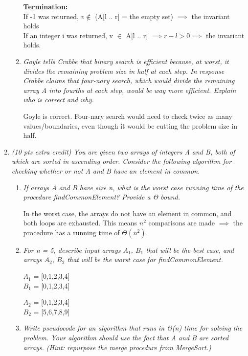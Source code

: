 \documentclass[12pt]{article}
\begin{document}
\begin{enumerate}
\begin{enumerate}
		\textbf{Termination:}\\ If -1 was returned, $v \notin$ (A[l .. r] = the empty set) $\implies$ the invariant holds \\ 
		If an integer i was returned, v $\in$ A[l .. r] $\implies r - l > 0 \implies$ the invariant holds.


		\item \textit{ Goyle tells Crabbe that binary search is efficient because, at worst, it divides the remaining problem size in half at each step. In response Crabbe claims that four-nary search, which would divide the remaining array A into fourths at each step, would be way more efficient. Explain who is correct and why.} 

		Goyle is correct. Four-nary search would need to check twice as many values/boundaries, even though it would be cutting the problem size in half. 


	\end{enumerate} 

	\newpage

	\item \textit{(10 pts extra credit) You are given two arrays of integers A and B, both of which are sorted in ascending order. Consider the following algorithm for checking whether or not A and B have an element in common.}


	\begin{enumerate}

		\item \textit{If arrays A and B have size n, what is the worst case running time of the procedure findCommonElement? Provide a Θ bound.} 

		In the worst case, the arrays do not have an element in common, and both loops are exhausted. This means $n^2$ comparisons are made $\implies$ the procedure has a running time of $\Theta(n^2)$.

		\item \textit{For n = 5, describe input arrays $A_1$, $B_1$ that will be the best case, and arrays $A_2$, $B_2$ that will be the worst case for findCommonElement.} 

		\textbf{$A_1$} = [0,1,2,3,4] \\
		\textbf{$B_1$} = [0,1,2,3,4] 
		\medskip

		\textbf{$A_2$} = [0,1,2,3,4] \\
		\textbf{$B_2$} = [5,6,7,8,9] 


		\item \textit{Write pseudocode for an algorithm that runs in Θ(n) time for solving the problem. Your algorithm should use the fact that A and B are sorted arrays. (Hint: repurpose the merge procedure from MergeSort.)} 


\end{enumerate}
\end{enumerate}
\end{document}
